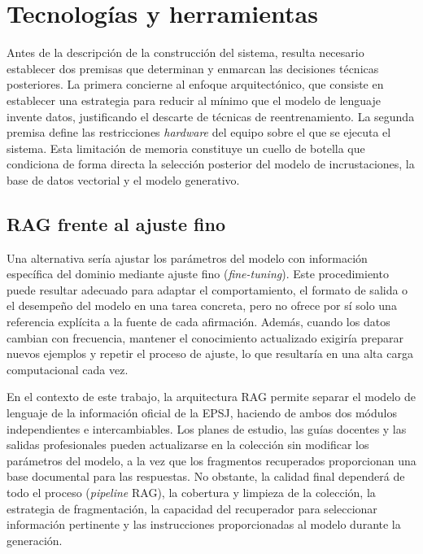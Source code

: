 


\section{Tecnologías y herramientas}

Antes de la descripción de la construcción del sistema, resulta necesario establecer dos premisas que determinan y enmarcan las decisiones técnicas posteriores. La primera concierne al enfoque arquitectónico, que consiste en establecer una estrategia para reducir al mínimo que el modelo de lenguaje invente datos, justificando el descarte de técnicas de reentrenamiento. La segunda premisa define las restricciones \textit{hardware} del equipo sobre el que se ejecuta el sistema. Esta limitación de memoria constituye un cuello de botella que condiciona de forma directa la selección posterior del modelo de incrustaciones, la base de datos vectorial y el modelo generativo.

\subsection{RAG frente al ajuste fino}

Una alternativa sería ajustar los parámetros del modelo con información específica del dominio mediante ajuste fino (\textit{fine-tuning}). Este procedimiento puede resultar adecuado para adaptar el comportamiento, el formato de salida o el desempeño del modelo en una tarea concreta, pero no ofrece por sí solo una referencia explícita a la fuente de cada afirmación. Además, cuando los datos cambian con frecuencia, mantener el conocimiento actualizado exigiría preparar nuevos ejemplos y repetir el proceso de ajuste, lo que resultaría en una alta carga computacional cada vez.

En el contexto de este trabajo, la arquitectura RAG permite separar el modelo de lenguaje de la información oficial de la EPSJ, haciendo de ambos dos módulos independientes e intercambiables. Los planes de estudio, las guías docentes y las salidas profesionales pueden actualizarse en la colección sin modificar los parámetros del modelo, a la vez que los fragmentos recuperados proporcionan una base documental para las respuestas. No obstante, la calidad final dependerá de todo el proceso (\textit{pipeline} RAG), la cobertura y limpieza de la colección, la estrategia de fragmentación, la capacidad del recuperador para seleccionar información pertinente y las instrucciones proporcionadas al modelo durante la generación.


